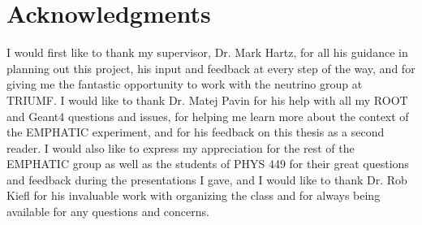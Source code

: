 
\chapter{Acknowledgments}
I would first like to thank my supervisor, Dr. Mark Hartz, for all his guidance in planning out this project, his input and feedback at every step of the way, and for giving me the fantastic opportunity to work with the neutrino group at TRIUMF. I would like to thank Dr. Matej Pavin for his help with all my ROOT and Geant4 questions and issues, for helping me learn more about the context of the EMPHATIC experiment, and for his feedback on this thesis as a second reader. I would also like to express my appreciation for the rest of the EMPHATIC group as well as the students of PHYS 449 for their great questions and feedback during the presentations I gave, and I would like to thank Dr. Rob Kiefl for his invaluable work with organizing the class and for always being available for any questions and concerns.